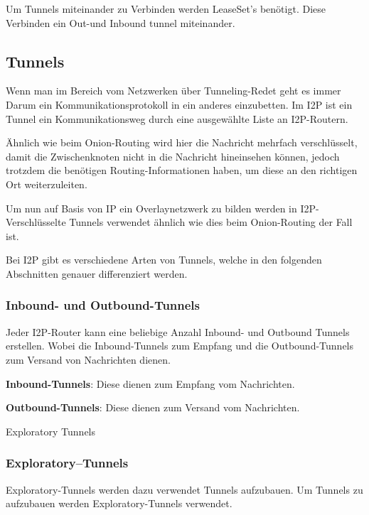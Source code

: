Um Tunnels miteinander zu Verbinden werden LeaseSet's benötigt. Diese Verbinden ein Out-und Inbound tunnel miteinander. \cite{noauthor_intro_nodate}

\subsection{Tunnels}

Wenn man im Bereich vom Netzwerken über Tunneling-Redet geht es immer Darum ein Kommunikationsprotokoll in ein anderes einzubetten. \cite{noauthor_duden_nodate}
Im I2P ist ein Tunnel ein Kommunikationsweg durch eine ausgewählte Liste an I2P-Routern.

Ähnlich wie beim Onion-Routing wird hier die Nachricht mehrfach verschlüsselt, damit die Zwischenknoten nicht in die Nachricht hineinsehen können, jedoch trotzdem die benötigen Routing-Informationen haben, um diese an den richtigen Ort weiterzuleiten.

\cite{noauthor_intro_nodate}

Um nun auf Basis von IP ein Overlaynetzwerk zu bilden werden in I2P-Verschlüsselte Tunnels verwendet ähnlich wie dies beim Onion-Routing der Fall ist.


Bei I2P gibt es verschiedene Arten von Tunnels, welche in den folgenden Abschnitten genauer differenziert werden.

\subsubsection{Inbound- und Outbound-Tunnels}
Jeder I2P-Router kann eine beliebige Anzahl Inbound- und Outbound Tunnels erstellen.
Wobei die Inbound-Tunnels zum Empfang und die Outbound-Tunnels zum Versand von Nachrichten dienen.
\cite{noauthor_intro_nodate}

    \item \textbf{Inbound-Tunnels}: Diese dienen zum Empfang vom Nachrichten.
    \item \textbf{Outbound-Tunnels}: Diese dienen zum Versand vom Nachrichten.
    \item Exploratory Tunnels

\cite{noauthor_intro_nodate}

\subsubsection{Exploratory--Tunnels}

Exploratory-Tunnels werden dazu verwendet Tunnels aufzubauen.
Um Tunnels zu aufzubauen werden Exploratory-Tunnels verwendet.

